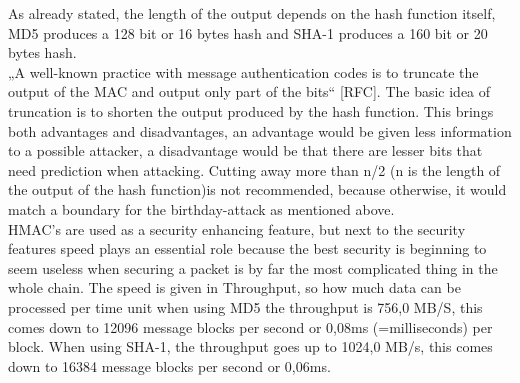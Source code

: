 As already stated, the length of the output depends on the hash function itself, MD5 produces a 128 bit or 16 bytes hash and SHA-1 produces a 160 bit or 20 bytes hash. \\
„A well-known practice with message authentication codes is to truncate the output of the MAC and output only part of the bits“ [RFC]. The basic idea of truncation is to shorten the output produced by the hash function. This brings both advantages and disadvantages, an advantage would be given less information to a possible attacker, a disadvantage would be that there are lesser bits that need prediction when attacking. Cutting away more than n/2 (n is the length of the output of the hash function)is not recommended, because otherwise, it would match a boundary for the birthday-attack as mentioned above. \\
HMAC’s are used as a security enhancing feature, but next to the security features speed plays an essential role because the best security is beginning to seem useless when securing a packet is by far the most complicated thing in the whole chain. The speed is given in Throughput, so how much data can be processed per time unit when using MD5 the throughput is 756,0 MB/S, this comes down to 12096 message blocks per second or 0,08ms (=milliseconds) per block. When using SHA-1, the throughput goes up to 1024,0 MB/s, this comes down to 16384 message blocks per second or 0,06ms.



